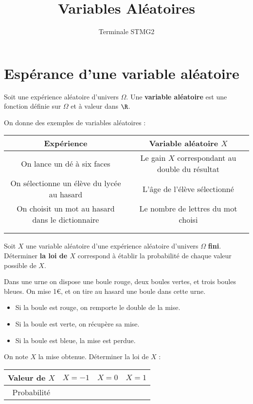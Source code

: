 \documentclass{article}
\title{Variables Aléatoires}
\date{}
\author{Terminale STMG2}
\begin{document}
\maketitle
\section{Espérance d'une variable aléatoire}
\begin{tcolorbox}
\begin{definition}
Soit une expérience aléatoire d'univers $\Omega$. Une \textbf{variable aléatoire} est une fonction définie sur $\Omega$ et à valeur dans $\R$. 
\end{definition}
\end{tcolorbox}
\begin{example}
On donne des exemples de variables aléatoires :
\begin{center}
\begin{tabular}{|c|c|}
\hline
Expérience&Variable aléatoire $X$\\
\hline
On lance un dé à six faces & Le gain $X$ correspondant au double du résultat\\
\hline
On sélectionne un élève du lycée au hasard & L'âge de l'élève sélectionné\\
\hline
On choisit un mot au hasard dans le dictionnaire & Le nombre de lettres du mot choisi\\
\hline
&\\
\hline
&\\
\hline
\end{tabular}
\end{center}
\end{example}
\begin{tcolorbox}
\begin{definition}
Soit $X$ une variable aléatoire d'une expérience aléatoire d'univers $\Omega$ \textbf{fini}. Déterminer \textbf{la loi de $X$} correspond à établir la probabilité de chaque valeur possible de $X$.
\end{definition}
\end{tcolorbox}
\begin{example}
Dans une urne on dispose une boule rouge, deux boules vertes, et trois boules bleues. On mise 1€, et on tire au hasard une boule dans cette urne.
\begin{itemize}
\item Si la boule est rouge, on remporte le double de la mise.
\item Si la boule est verte, on récupère sa mise.
\item Si la boule est bleue, la mise est perdue.
\end{itemize}
On note $X$ la mise obtenue. Déterminer la loi de $X$ :
\begin{center}
\begin{tabular}{|c|c|c|c|}
\hline
Valeur de $X$&$X=-1$&$X=0$&$X=1$\\
\hline
Probabilité&&&\\
\hline
\end{tabular}
\end{center}
\end{example}
\end{document}

